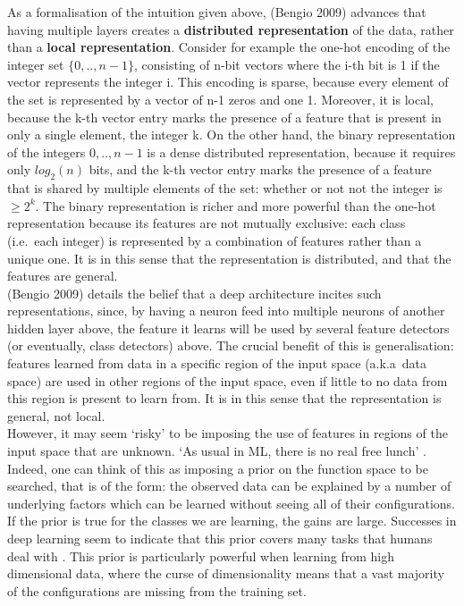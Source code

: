 \documentclass[a4paper,11pt]{article}
\begin{document}
As a formalisation of the intuition given above, (Bengio 2009) \cite{DL-book} advances that having multiple layers creates a \textbf{distributed representation} of the data, rather than a \textbf{local representation}. Consider for example the one-hot encoding of the integer set $\{0, .., n-1\}$, consisting of n-bit vectors where the i-th bit is 1 if the vector represents the integer i. This encoding is sparse, because every element of the set is represented by a vector of n-1 zeros and one 1. Moreover, it is local, because the k-th vector entry marks the presence of a feature that is present in only a single element, the integer k. On the other hand, the binary representation of the integers ${0, .., n-1}$ is a dense distributed representation, because it requires only $log_2(n)$ bits, and the k-th vector entry marks the presence of a feature that is shared by multiple elements of the set: whether or not not the integer is $\geq 2^k$. The binary representation is richer and more powerful than the one-hot representation because its features are not mutually exclusive: each class (i.e.\ each integer) is represented by a combination of features rather than a unique one. It is in this sense that the representation is distributed, and that the features are general. \\

(Bengio 2009) \cite{DL-book} details the belief that a deep architecture incites such representations, since, by having a neuron feed into multiple neurons of another hidden layer above, the feature it learns will be used by several feature detectors (or eventually, class detectors) above. The crucial benefit of this is generalisation: features learned from data in a specific region of the input space (a.k.a\ data space) are used in other regions of the input space, even if little to no data from this region is present to learn from. It is in this sense that the representation is general, not local. \\

However, it may seem `risky' to be imposing the use of features in regions of the input space that are unknown. `As usual in ML, there is no real free lunch' \cite{Bengio_G+}. Indeed, one can think of this as imposing a prior on the function space to be searched, that is of the form: the observed data can be explained by a number of underlying factors which can be learned without seeing all of their configurations. If the prior is true for the classes we are learning, the gains are large. Successes in deep learning seem to indicate that this prior covers many tasks that humans deal with \cite{Bengio_G+}. This prior is particularly powerful when learning from high dimensional data, where the curse of dimensionality means that a vast majority of the configurations are missing from the training set. \\
\end{document}
